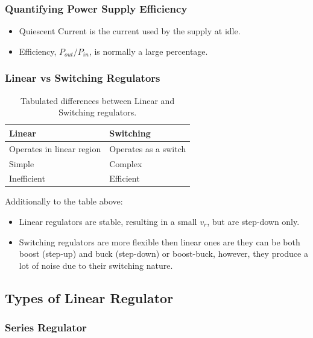 \subsubsection{Quantifying Power Supply Efficiency}

\begin{itemize}
	\item Quiescent Current is the current used by the supply at idle.
	\item Efficiency, $P_{out} / P_{in}$, is normally a large percentage.
\end{itemize}

\subsubsection{Linear vs Switching Regulators}

\begin{table}[H]
	\centering
	\caption{Tabulated differences between Linear and Switching regulators.}
    \begin{tabular}{ll}
    Linear & Switching \\
    \hline
    Operates in linear region & Operates as a switch \\
    Simple & Complex \\
    Inefficient & Efficient
    \end{tabular}
\end{table}

Additionally to the table above:

\begin{itemize}
	\item Linear regulators are stable, resulting in a small $v_r$, but are step-down only.
	\item Switching regulators are more flexible then linear ones are they can be both boost (step-up) and buck (step-down) or boost-buck, however, they produce a lot of noise due to their switching nature.
\end{itemize}

\subsection{Types of Linear Regulator}


\subsubsection{Series Regulator}

